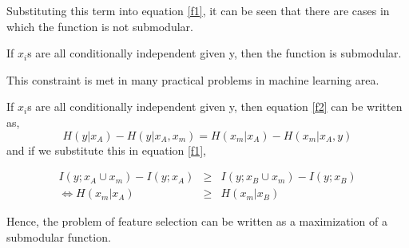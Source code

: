  Substituting this term into equation \ref{f1}, it can be seen that there are cases in which the function is not submodular.

{\bf \lemma}
If $x_i$s are all conditionally independent given y, then the function is submodular\cite{krausefeature}.

This constraint is met in many practical problems in machine learning area.


If $x_i$s are all conditionally independent given y, then equation \ref{f2} can be written  as,
\begin{equation*}
H(y|x_A)-H(y|x_A,x_m)=H(x_m|x_A)-H(x_m|x_A,y)
\end{equation*}
and if we substitute this in equation \ref{f1},


\begin{eqnarray*}
I(y;x_A \cup x_m) - I(y;x_A) &\geq & I(y;x_B \cup x_m) - I(y;x_B) \nonumber \\
\Leftrightarrow H(x_m|x_A) &\geq & H(x_m|x_B)
\end{eqnarray*} 

Hence, the problem of feature selection can be written as a maximization of a submodular function.\cite{jie}